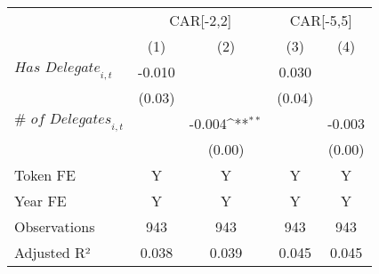 {
\def\sym#1{\ifmmode^{#1}\else\(^{#1}\)\fi}
\begin{tabular}{l*{4}{c}}
\toprule
                    &\multicolumn{2}{c}{CAR[-2,2]}              &\multicolumn{2}{c}{CAR[-5,5]}              \\\cmidrule(lr){2-3}\cmidrule(lr){4-5}
                    &\multicolumn{1}{c}{(1)}         &\multicolumn{1}{c}{(2)}         &\multicolumn{1}{c}{(3)}         &\multicolumn{1}{c}{(4)}         \\
\midrule
$\textit{Has Delegate}_{i,t}$&      -0.010         &                     &       0.030         &                     \\
                    &      (0.03)         &                     &      (0.04)         &                     \\
$\textit{# of Delegates}_{i,t}$&                     &      -0.004\sym{**} &                     &      -0.003         \\
                    &                     &      (0.00)         &                     &      (0.00)         \\
\midrule
Token FE            &           Y         &           Y         &           Y         &           Y         \\
Year FE             &           Y         &           Y         &           Y         &           Y         \\
Observations        &         943         &         943         &         943         &         943         \\
Adjusted R²         &       0.038         &       0.039         &       0.045         &       0.045         \\
\bottomrule
\end{tabular}
}
